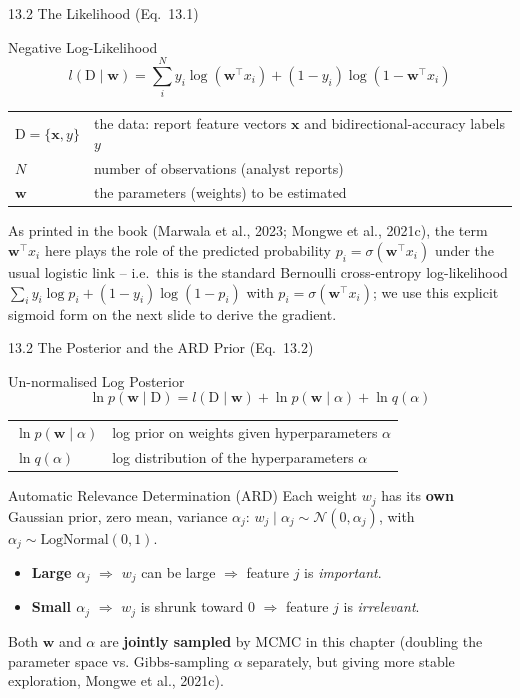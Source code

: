 \documentclass[aspectratio=169,10pt]{beamer}
\newcommand{\w}{\mathbf{w}}
\newcommand{\x}{\mathbf{x}}
\newcommand{\Data}{\mathrm{D}}
\newcommand{\sig}{\sigma}
\begin{document}
\begin{frame}{13.2 \; The Likelihood (Eq.~13.1)}
  \begin{block}{Negative Log-Likelihood}
    \[
      l(\Data\mid\w) = \sum_{i}^{N} y_i\log(\w^\top x_i) + (1-y_i)\log(1-\w^\top x_i)
    \]
    \begin{tabular}{ll}
      $\Data=\{\x,y\}$ & the data: report feature vectors $\x$ and bidirectional-accuracy labels $y$\\
      $N$              & number of observations (analyst reports)\\
      $\w$              & the parameters (weights) to be estimated\\
    \end{tabular}
  \end{block}
  \vspace{4pt}
  As printed in the book (Marwala et al., 2023; Mongwe et al., 2021c), the
  term $\w^\top x_i$ here plays the role of the predicted probability
  $p_i=\sig(\w^\top x_i)$ under the usual logistic link -- i.e.\ this is the
  standard Bernoulli cross-entropy log-likelihood
  $\sum_i y_i\log p_i + (1-y_i)\log(1-p_i)$ with $p_i=\sig(\w^\top x_i)$; we
  use this explicit sigmoid form on the next slide to derive the gradient.
\end{frame}

\begin{frame}{13.2 \; The Posterior and the ARD Prior (Eq.~13.2)}
  \begin{block}{Un-normalised Log Posterior}
    \[
      \ln p(\w\mid \Data) = l(\Data\mid\w) + \ln p(\w\mid\alpha) + \ln q(\alpha)
    \]
    \begin{tabular}{ll}
      $\ln p(\w\mid\alpha)$ & log prior on weights given hyperparameters $\alpha$\\
      $\ln q(\alpha)$        & log distribution of the hyperparameters $\alpha$\\
    \end{tabular}
  \end{block}
  \begin{alertblock}{Automatic Relevance Determination (ARD)}
    Each weight $w_j$ has its \textbf{own} Gaussian prior, zero mean, variance
    $\alpha_j$: $w_j\mid\alpha_j\sim\mathcal N(0,\alpha_j)$, with
    $\alpha_j\sim\text{LogNormal}(0,1)$.
    \begin{itemize}
      \item \textbf{Large $\alpha_j$} $\Rightarrow$ $w_j$ can be large
            $\Rightarrow$ feature $j$ is \emph{important}.
      \item \textbf{Small $\alpha_j$} $\Rightarrow$ $w_j$ is shrunk toward
            $0$ $\Rightarrow$ feature $j$ is \emph{irrelevant}.
    \end{itemize}
    Both $\w$ and $\alpha$ are \textbf{jointly sampled} by MCMC in this
    chapter (doubling the parameter space vs. Gibbs-sampling $\alpha$
    separately, but giving more stable exploration, Mongwe et al., 2021c).
  \end{alertblock}
\end{frame}
\end{document}

